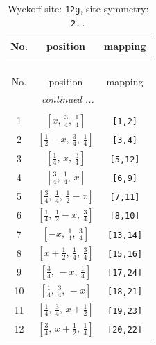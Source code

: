 \documentclass[fleqn,8pt]{jsarticle}
\begin{document}
\begin{longtable}{ccc}
\caption{Wyckoff site: {\tt 12g}, site symmetry: {\tt 2..}}
 \\
 \hline \hline
No. & position & mapping \\ \hline \endfirsthead

\multicolumn{2}{l}{\tablename\ \thetable{}} \\
 \hline \hline
No. & position & mapping \\ \hline \endhead

 \hline \hline
\multicolumn{2}{r}{\footnotesize\it continued ...} \\ \endfoot

 \hline \hline
\multicolumn{2}{r}{} \\ \endlastfoot

1 & $\left[ x,\, \frac{3}{4},\, \frac{1}{4} \right]$ & {\tt [1,2]} \\ \hline
2 & $\left[ \frac{1}{2} - x,\, \frac{3}{4},\, \frac{1}{4} \right]$ & {\tt [3,4]} \\ \hline
3 & $\left[ \frac{1}{4},\, x,\, \frac{3}{4} \right]$ & {\tt [5,12]} \\ \hline
4 & $\left[ \frac{3}{4},\, \frac{1}{4},\, x \right]$ & {\tt [6,9]} \\ \hline
5 & $\left[ \frac{3}{4},\, \frac{1}{4},\, \frac{1}{2} - x \right]$ & {\tt [7,11]} \\ \hline
6 & $\left[ \frac{1}{4},\, \frac{1}{2} - x,\, \frac{3}{4} \right]$ & {\tt [8,10]} \\ \hline
7 & $\left[ - x,\, \frac{1}{4},\, \frac{3}{4} \right]$ & {\tt [13,14]} \\ \hline
8 & $\left[ x + \frac{1}{2},\, \frac{1}{4},\, \frac{3}{4} \right]$ & {\tt [15,16]} \\ \hline
9 & $\left[ \frac{3}{4},\, - x,\, \frac{1}{4} \right]$ & {\tt [17,24]} \\ \hline
10 & $\left[ \frac{1}{4},\, \frac{3}{4},\, - x \right]$ & {\tt [18,21]} \\ \hline
11 & $\left[ \frac{1}{4},\, \frac{3}{4},\, x + \frac{1}{2} \right]$ & {\tt [19,23]} \\ \hline
12 & $\left[ \frac{3}{4},\, x + \frac{1}{2},\, \frac{1}{4} \right]$ & {\tt [20,22]} \\
\end{longtable}
\renewcommand{\arraystretch}{1.2}
\end{document}
